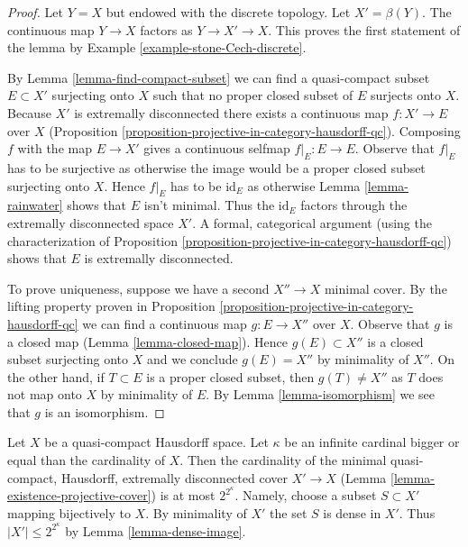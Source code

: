 \begin{proof}
Let $Y = X$ but endowed with the discrete topology. Let $X' = \beta(Y)$.
The continuous map $Y \to X$ factors as $Y \to X' \to X$. This
proves the first statement of the lemma by
Example \ref{example-stone-Cech-discrete}.

\medskip\noindent
By Lemma \ref{lemma-find-compact-subset} we can find a quasi-compact subset
$E \subset X'$ surjecting onto $X$ such that no proper closed subset of $E$
surjects onto $X$.
Because $X'$ is extremally disconnected there exists a continuous map
$f : X' \to E$ over $X$
(Proposition \ref{proposition-projective-in-category-hausdorff-qc}).
Composing $f$ with the map $E \to X'$ gives a continuous selfmap
$f|_E : E \to E$. Observe that $f|_E$ has to be surjective as otherwise
the image would be a proper closed subset surjecting onto $X$.
Hence $f|_E$ has to be $\text{id}_E$ as otherwise
Lemma \ref{lemma-rainwater} shows that $E$ isn't minimal.
Thus the $\text{id}_E$ factors through the extremally disconnected
space $X'$. A formal, categorical argument (using the characterization of
Proposition \ref{proposition-projective-in-category-hausdorff-qc})
shows that $E$ is extremally disconnected.

\medskip\noindent
To prove uniqueness, suppose we have a second $X'' \to X$
minimal cover. By the lifting property proven in
Proposition \ref{proposition-projective-in-category-hausdorff-qc}
we can find a continuous map $g : E \to X''$ over $X$.
Observe that $g$ is a closed map (Lemma \ref{lemma-closed-map}).
Hence $g(E) \subset X''$ is a closed subset surjecting onto $X$
and we conclude $g(E) = X''$ by minimality of $X''$.
On the other hand, if $T \subset E$ is a proper closed subset,
then $g(T) \not = X''$ as $T$ does not map onto $X$ by minimality
of $E$. By Lemma \ref{lemma-isomorphism} we see that $g$ is an isomorphism.
\end{proof}

\begin{remark}
\label{remark-size-projective-cover}
Let $X$ be a quasi-compact Hausdorff space. Let $\kappa$ be an infinite
cardinal bigger or equal than the cardinality of $X$. Then the cardinality
of the minimal quasi-compact, Hausdorff, extremally disconnected cover
$X' \to X$ (Lemma \ref{lemma-existence-projective-cover})
is at most $2^{2^\kappa}$. Namely, choose a subset $S \subset X'$
mapping bijectively to $X$. By minimality of $X'$ the set $S$ is dense
in $X'$. Thus $|X'| \leq 2^{2^\kappa}$ by Lemma \ref{lemma-dense-image}.
\end{remark}






